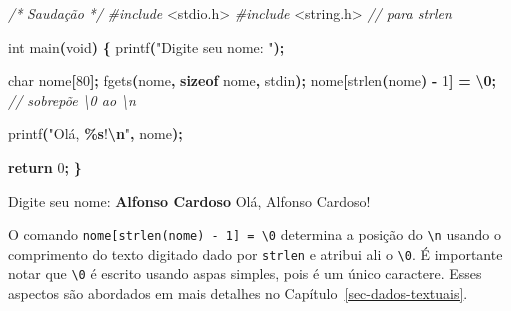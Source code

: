 \documentclass[
  11pt,
  a4paper,
]{scrbook}
\newenvironment{Shaded}{\begin{snugshade}}{\end{snugshade}}
\newcommand{\CharTok}[1]{\textcolor[rgb]{0.31,0.60,0.02}{#1}}
\newcommand{\CommentTok}[1]{\textcolor[rgb]{0.56,0.35,0.01}{\textit{#1}}}
\newcommand{\ControlFlowTok}[1]{\textcolor[rgb]{0.13,0.29,0.53}{\textbf{#1}}}
\newcommand{\DataTypeTok}[1]{\textcolor[rgb]{0.13,0.29,0.53}{#1}}
\newcommand{\DecValTok}[1]{\textcolor[rgb]{0.00,0.00,0.81}{#1}}
\newcommand{\ImportTok}[1]{#1}
\newcommand{\KeywordTok}[1]{\textcolor[rgb]{0.13,0.29,0.53}{\textbf{#1}}}
\newcommand{\NormalTok}[1]{#1}
\newcommand{\OperatorTok}[1]{\textcolor[rgb]{0.81,0.36,0.00}{\textbf{#1}}}
\newcommand{\PreprocessorTok}[1]{\textcolor[rgb]{0.56,0.35,0.01}{\textit{#1}}}
\newcommand{\SpecialCharTok}[1]{\textcolor[rgb]{0.81,0.36,0.00}{\textbf{#1}}}
\newcommand{\StringTok}[1]{\textcolor[rgb]{0.31,0.60,0.02}{#1}}
\begin{document}
\begin{Shaded}
\begin{Highlighting}[]
\CommentTok{/* }
\CommentTok{Saudação}
\CommentTok{*/}
\PreprocessorTok{\#include }\ImportTok{\textless{}stdio.h\textgreater{}}
\PreprocessorTok{\#include }\ImportTok{\textless{}string.h\textgreater{}}\PreprocessorTok{  }\CommentTok{// para strlen}

\DataTypeTok{int}\NormalTok{ main}\OperatorTok{(}\DataTypeTok{void}\OperatorTok{)} \OperatorTok{\{}
\NormalTok{    printf}\OperatorTok{(}\StringTok{"Digite seu nome: "}\OperatorTok{);}

    \DataTypeTok{char}\NormalTok{ nome}\OperatorTok{[}\DecValTok{80}\OperatorTok{];}
\NormalTok{    fgets}\OperatorTok{(}\NormalTok{nome}\OperatorTok{,} \KeywordTok{sizeof}\NormalTok{ nome}\OperatorTok{,}\NormalTok{ stdin}\OperatorTok{);}
\NormalTok{    nome}\OperatorTok{[}\NormalTok{strlen}\OperatorTok{(}\NormalTok{nome}\OperatorTok{)} \OperatorTok{{-}} \DecValTok{1}\OperatorTok{]} \OperatorTok{=} \CharTok{\textquotesingle{}}\SpecialCharTok{\textbackslash{}0}\CharTok{\textquotesingle{}}\OperatorTok{;}  \CommentTok{// sobrepõe \textquotesingle{}\textbackslash{}0\textquotesingle{} ao \textquotesingle{}\textbackslash{}n\textquotesingle{}}

\NormalTok{    printf}\OperatorTok{(}\StringTok{"Olá, }\SpecialCharTok{\%s}\StringTok{!}\SpecialCharTok{\textbackslash{}n}\StringTok{"}\OperatorTok{,}\NormalTok{ nome}\OperatorTok{);}

    \ControlFlowTok{return} \DecValTok{0}\OperatorTok{;}
\OperatorTok{\}}
\end{Highlighting}
\end{Shaded}

\begin{Shaded}
\begin{Highlighting}[]
\NormalTok{Digite seu nome: }\KeywordTok{ Alfonso Cardoso }
\NormalTok{Olá, Alfonso Cardoso!}
\end{Highlighting}
\end{Shaded}

O comando
\texttt{nome{[}strlen(nome)\ -\ 1{]}\ =\ \textquotesingle{}\textbackslash{}0\textquotesingle{}}
determina a posição do \texttt{\textbackslash{}n} usando o comprimento
do texto digitado dado por \texttt{strlen} e atribui ali o
\texttt{\textbackslash{}0}. É importante notar que
\texttt{\textquotesingle{}\textbackslash{}0\textquotesingle{}} é escrito
usando aspas simples, pois é um único caractere. Esses aspectos são
abordados em mais detalhes no Capítulo~\ref{sec-dados-textuais}.
\end{document}
